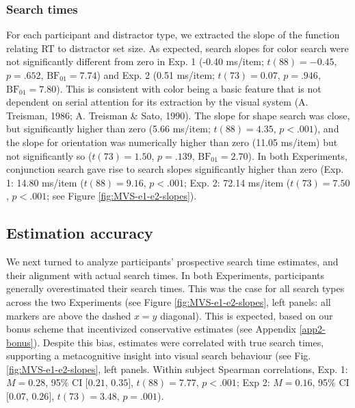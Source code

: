 \documentclass[12pt,twoside]{reedthesis}
\begin{document}
\hypertarget{search-times}{%
\subsubsection*{Search times}\label{search-times}}

For each participant and distractor type, we extracted the slope of the function relating RT to distractor set size. As expected, search slopes for color search were not significantly different from zero in Exp. 1 (-0.40 ms/item; \(t(88) = -0.45\), \(p = .652\), \(\mathrm{BF}_{\textrm{01}} = 7.74\)) and Exp. 2 (0.51 ms/item; \(t(73) = 0.07\), \(p = .946\), \(\mathrm{BF}_{\textrm{01}} = 7.80\)). This is consistent with color being a basic feature that is not dependent on serial attention for its extraction by the visual system (A. Treisman, 1986; A. Treisman \& Sato, 1990). The slope for shape search was close, but significantly higher than zero (5.66 ms/item; \(t(88) = 4.35\), \(p < .001\)), and the slope for orientation was numerically higher than zero (11.05 ms/item) but not significantly so (\(t(73) = 1.50\), \(p = .139\), \(\mathrm{BF}_{\textrm{01}} = 2.70\)). In both Experiments, conjunction search gave rise to search slopes significantly higher than zero (Exp. 1: 14.80 ms/item (\(t(88) = 9.16\), \(p < .001\); Exp. 2: 72.14 ms/item (\(t(73) = 7.50\), \(p < .001\); see Figure \ref{fig:MVS-e1-e2-slopes}).

\hypertarget{estimation-accuracy}{%
\subsection*{Estimation accuracy}\label{estimation-accuracy}}

We next turned to analyze participants' prospective search time estimates, and their alignment with actual search times. In both Experiments, participants generally overestimated their search times. This was the case for all search types across the two Experiments (see Figure \ref{fig:MVS-e1-e2-slopes}, left panels: all markers are above the dashed \(x=y\) diagonal). This is expected, based on our bonus scheme that incentivized conservative estimates (see Appendix \ref{app2-bonus}). Despite this bias, estimates were correlated with true search times, supporting a metacognitive insight into visual search behaviour (see Fig. \ref{fig:MVS-e1-e2-slopes}, left panels. Within subject Spearman correlations, Exp. 1: \(M = 0.28\), 95\% CI \([0.21\), \(0.35]\), \(t(88) = 7.77\), \(p < .001\); Exp 2: \(M = 0.16\), 95\% CI \([0.07\), \(0.26]\), \(t(73) = 3.48\), \(p = .001\)).
\end{document}
